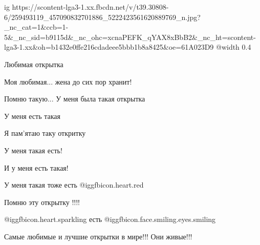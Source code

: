  
 
 
 
 

\ifcmt
  ig https://scontent-lga3-1.xx.fbcdn.net/v/t39.30808-6/259493119_457090832701886_5222423561620889769_n.jpg?_nc_cat=1&ccb=1-5&_nc_sid=b9115d&_nc_ohc=xcnaPEFK_qYAX8xBbB2&_nc_ht=scontent-lga3-1.xx&oh=b1432e0ffe216cdadeee5bbb1b8a8425&oe=61A023D9
  @width 0.4
\fi

\columnbreak

Любимая открытка

Моя любимая... жена до сих пор хранит!

Помню такую... У меня была такая открытка

У меня есть такая

Я пам'ятаю таку откритку

У меня такая есть!

И у меня есть такая!

У меня такая тоже есть @igg{fbicon.heart.red}

Помню эту открытку !!!!

 @igg{fbicon.heart.sparkling}  есть  @igg{fbicon.face.smiling.eyes.smiling} 

Самые любимые и лучшие открытки в мире!!! Они живые!!!
